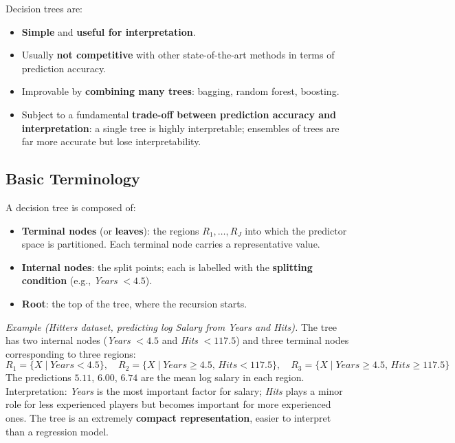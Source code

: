 \documentclass[11pt,a4paper]{article}
\theoremstyle{definition}
\theoremstyle{plain}
\theoremstyle{remark}
\begin{document}
Decision trees are:
\begin{itemize}
    \item \textbf{Simple} and \textbf{useful for interpretation}.
    \item Usually \textbf{not competitive} with other state-of-the-art methods in terms of prediction accuracy.
    \item Improvable by \textbf{combining many trees}: bagging, random forest, boosting.
    \item Subject to a fundamental \textbf{trade-off between prediction accuracy and interpretation}: a single tree is highly interpretable; ensembles of trees are far more accurate but lose interpretability.
\end{itemize}

\subsection{Basic Terminology}

A decision tree is composed of:
\begin{itemize}
    \item \textbf{Terminal nodes} (or \textbf{leaves}): the regions $R_1, \ldots, R_J$ into which the predictor space is partitioned. Each terminal node carries a representative value.
    \item \textbf{Internal nodes}: the split points; each is labelled with the \textbf{splitting condition} (e.g., \textit{Years} $< 4.5$).
    \item \textbf{Root}: the top of the tree, where the recursion starts.
\end{itemize}

\textit{Example (Hitters dataset, predicting log Salary from Years and Hits).} The tree has two internal nodes (\textit{Years} $< 4.5$ and \textit{Hits} $< 117.5$) and three terminal nodes corresponding to three regions:
\[
    R_1 = \{X \mid \textit{Years} < 4.5\}, \quad R_2 = \{X \mid \textit{Years} \geq 4.5,\, \textit{Hits} < 117.5\}, \quad R_3 = \{X \mid \textit{Years} \geq 4.5,\, \textit{Hits} \geq 117.5\}
\]
The predictions $5.11$, $6.00$, $6.74$ are the mean log salary in each region. Interpretation: \textit{Years} is the most important factor for salary; \textit{Hits} plays a minor role for less experienced players but becomes important for more experienced ones. The tree is an extremely \textbf{compact representation}, easier to interpret than a regression model.


\end{document}
